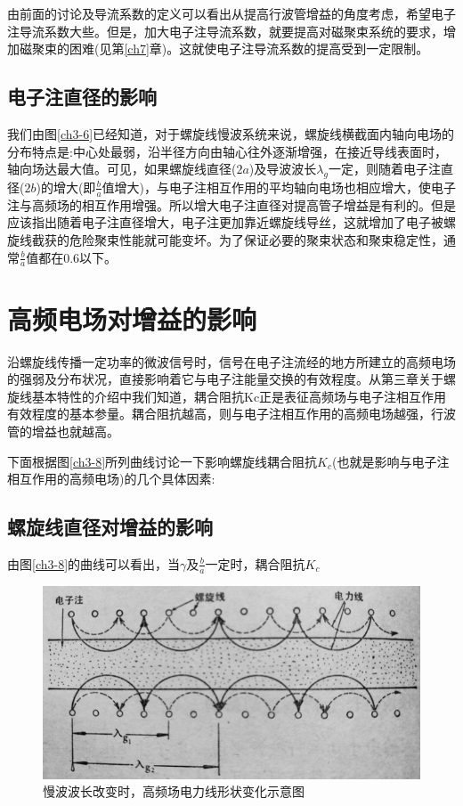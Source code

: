   由前面的讨论及导流系数的定义可以看出从提高行波管增益的角度考虑，希望电子注导流系数大些。但是，加大电子注导流系数，就要提高对磁聚束系统的要求，增加磁聚束的困难(见第\ref{ch7}章)。这就使电子注导流系数的提高受到一定限制。
	\subsection{电子注直径的影响}	
	我们由图\ref{ch3-6}已经知道，对于螺旋线慢波系统来说，螺旋线横截面内轴向电场的分布特点是:中心处最弱，沿半径方向由轴心往外逐渐增强，在接近导线表面时，轴向场达最大值。可见，如果螺旋线直径($ 2a $)及导波波长$ \lambda_g $一定，则随着电子注直径($ 2b $)的增大(即$ \frac{b}{a} $值增大)，与电子注相互作用的平均轴向电场也相应增大，使电子注与高频场的相互作用增强。所以增大电子注直径对提高管子增益是有利的。但是应该指出随着电子注直径增大，电子注更加靠近螺旋线导丝，这就增加了电子被螺旋线截获的危险聚束性能就可能变坏。为了保证必要的聚束状态和聚束稳定性，通常$ \frac{b}{a} $值都在0.6以下。




\section{高频电场对增益的影响}
沿螺旋线传播一定功率的微波信号时，信号在电子注流经的地方所建立的高频电场的强弱及分布状况，直接影响着它与电子注能量交换的有效程度。从第三章关于螺旋线基本特性的介绍中我们知道，耦合阻抗Kc正是表征高频场与电子注相互作用有效程度的基本参量。耦合阻抗越高，则与电子注相互作用的高频电场越强，行波管的增益也就越高。


下面根据图\ref{ch3-8}所列曲线讨论一下影响螺旋线耦合阻抗$ K_c $(也就是影响与电子注相互作用的高频电场)的几个具体因素:
 \subsection{螺旋线直径对增益的影响}
	
	由图\ref{ch3-8}的曲线可以看出，当$ \gamma $及$ \frac{b}{a} $一定时，耦合阻抗$ K_c $





\begin{figure}[phtb]
	\centering
	\includegraphics[width=0.65\linewidth]{figure/ch4-1}
	\caption{慢波波长改变时，高频场电力线形状变化示意图}
	\label{ch4-1}
\end{figure}

